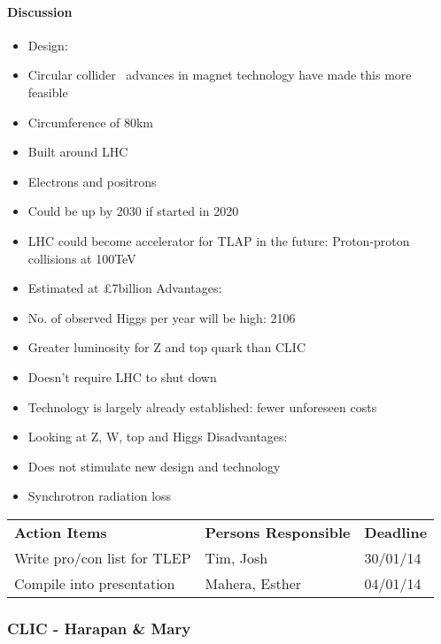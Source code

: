 \paragraph{Discussion}
\begin{itemize}  
  \item  Design:
  \item Circular collider  \textemdash \, advances in magnet technology have made this more feasible
\item  Circumference of 80km
\item  Built around LHC
\item  Electrons and positrons
\item  Could be up by 2030 if started in 2020
\item  LHC could become accelerator for TLAP in the future: Proton-proton collisions at 100TeV
\item  Estimated at £7billion
Advantages:
\item  No. of observed Higgs per year will be high: 2106
\item  Greater luminosity for Z and top quark than CLIC
\item  Doesn’t require LHC to shut down
\item  Technology is largely already established: fewer unforeseen costs
\item  Looking at Z, W, top and Higgs
Disadvantages:
\item  Does not stimulate new design and technology
\item  Synchrotron radiation loss
\end{itemize}

\begin{tabularx}{\textwidth}{X p{4.5cm} p{1.2cm}}
  \textbf{Action Items} & \textbf{Persons Responsible} & \textbf{Deadline} \\
  Write pro/con list for TLEP & Tim, Josh & 30/01/14 \\
  Compile into presentation & Mahera, Esther & 04/01/14 \\
\end{tabularx}

\subsubsection{CLIC - Harapan \& Mary}

